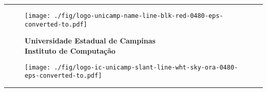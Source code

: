 \begin{center}
\rule{\textwidth}{1pt}
\end{center}

\vspace*{-0.2cm}

\begin{figure}[!ht]
\begin{minipage}[b]{2.3cm}
\centering
\hspace*{0.4cm}
\texttt{[image: ./fig/logo-unicamp-name-line-blk-red-0480-eps-converted-to.pdf]}
\end{minipage}
\begin{minipage}[b]{11.1cm}
\centering
\hspace*{0.4cm}
{\large \bf Universidade Estadual de Campinas} \\[0.2cm]
{\large \bf Instituto de Computação}
\end{minipage}
\begin{minipage}[b]{2.3cm}
\centering
\hspace*{0.4cm}
\texttt{[image: ./fig/logo-ic-unicamp-slant-line-wht-sky-ora-0480-eps-converted-to.pdf]}
\end{minipage}
\end{figure}

\vspace*{-0.2cm}

\begin{center}
\rule{\textwidth}{1pt}
\end{center}

\vspace*{0.3cm}